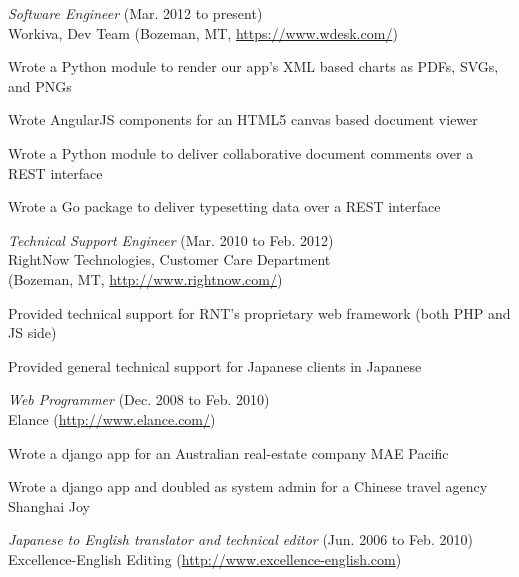 \documentclass[10pt, a4paper]{article}
\begin{document}
\begin{itemize*}
  \item \emph{Software Engineer} (Mar. 2012 to present)\\
    Workiva, Dev Team (Bozeman, MT, \url{https://www.wdesk.com/})
    \begin{itemize*}
      \item Wrote a Python module to render our app's XML based charts as PDFs, SVGs, and PNGs
      \item Wrote AngularJS components for an HTML5 canvas based document viewer
      \item Wrote a Python module to deliver collaborative document comments over a REST interface
      \item Wrote a Go package to deliver typesetting data over a REST interface
    \end{itemize*}
  \item \emph{Technical Support Engineer} (Mar. 2010 to Feb. 2012)\\
    RightNow Technologies, Customer Care Department\\
    (Bozeman, MT, \url{http://www.rightnow.com/})
    \begin{itemize*}
      \item Provided technical support for RNT's proprietary web framework (both PHP and JS side)
      \item Provided general technical support for Japanese clients in Japanese
    \end{itemize*}
  \item \emph{Web Programmer} (Dec. 2008 to Feb. 2010)\\
    Elance (\url{http://www.elance.com/})
    \begin{itemize*}
      \item Wrote a django app for an Australian real-estate company MAE Pacific
      \item Wrote a django app and doubled as system admin for a Chinese travel agency Shanghai Joy
    \end{itemize*}
  \item \emph{Japanese to English translator and technical editor} (Jun. 2006 to Feb. 2010)\\
    Excellence-English Editing (\url{http://www.excellence-english.com})
\end{itemize*}
\end{document}

